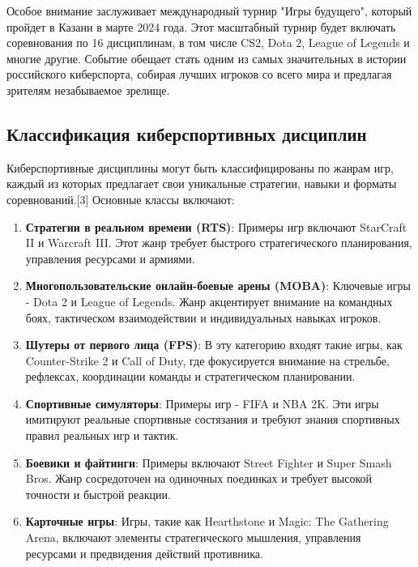 Особое внимание заслуживает международный турнир "Игры будущего", который пройдет в Казани в марте 2024 года. Этот масштабный турнир будет включать соревнования по 16 дисциплинам, в том числе CS2, Dota 2, League of Legends и многие другие. Событие обещает стать одним из самых значительных в истории российского киберспорта, собирая лучших игроков со всего мира и предлагая зрителям незабываемое зрелище.
\subsection{Классификация киберспортивных дисциплин}

Киберспортивные дисциплины могут быть классифицированы по жанрам игр, каждый из которых предлагает свои уникальные стратегии, навыки и форматы соревнований.[3] Основные классы включают:

\begin{enumerate}
	\item \textbf{Стратегии в реальном времени (RTS)}: 
	Примеры игр включают StarCraft II и Warcraft III. Этот жанр требует быстрого стратегического планирования, управления ресурсами и армиями.
	
	\item \textbf{Многопользовательские онлайн-боевые арены (MOBA)}: 
	Ключевые игры - Dota 2 и League of Legends. Жанр акцентирует внимание на командных боях, тактическом взаимодействии и индивидуальных навыках игроков.
	
	\item \textbf{Шутеры от первого лица (FPS)}: 
	В эту категорию входят такие игры, как Counter-Strike 2 и Call of Duty, где фокусируется внимание на стрельбе, рефлексах, координации команды и стратегическом планировании.
	
	\item \textbf{Спортивные симуляторы}: 
	Примеры игр - FIFA и NBA 2K. Эти игры имитируют реальные спортивные состязания и требуют знания спортивных правил реальных игр и тактик.
	
	\item \textbf{Боевики и файтинги}: 
	Примеры включают Street Fighter и Super Smash Bros. Жанр сосредоточен на одиночных поединках и требует высокой точности и быстрой реакции.
	
	\item \textbf{Карточные игры}: 
	Игры, такие как Hearthstone и Magic: The Gathering Arena, включают элементы стратегического мышления, управления ресурсами и предвидения действий противника.
\end{enumerate}
